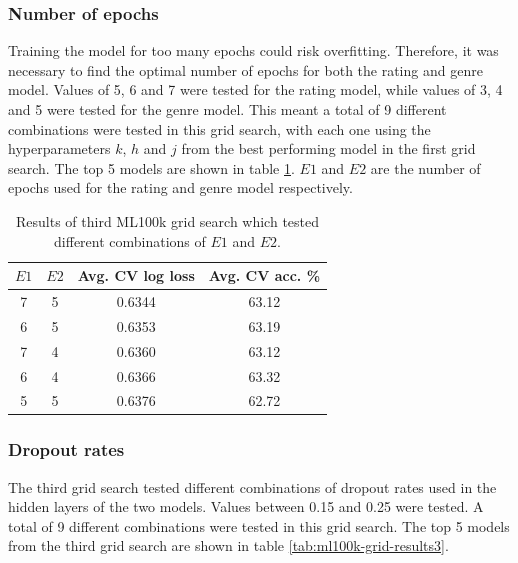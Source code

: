 \subsubsection{Number of epochs}
Training the model for too many epochs could risk overfitting. Therefore, it was necessary to find the optimal number of epochs for both the rating and genre model. Values of 5, 6 and 7 were tested for the rating model, while values of 3, 4 and 5 were tested for the genre model. This meant a total of 9 different combinations were tested in this grid search, with each one using the hyperparameters $k$, $h$ and $j$ from the best performing model in the first grid search. The top 5 models are shown in table \ref{tab:ml100k-grid-results2}. $E1$ and $E2$ are the number of epochs used for the rating and genre model respectively.

\begin{table}[H]
\centering
\begin{tabular}{c | c | c | c}
\toprule
\textbf{$E1$} & \textbf{$E2$} & \textbf{Avg. CV log loss} & \textbf{Avg. CV acc.} \% \\
\midrule
7 & 5 & 0.6344 & 63.12 \\
\midrule
6 & 5 & 0.6353 & 63.19 \\
\midrule
7 & 4 & 0.6360 & 63.12 \\
\midrule
6 & 4 & 0.6366 & 63.32 \\
\midrule
5 & 5 & 0.6376 & 62.72 \\
\bottomrule
\end{tabular}
\caption[MovieLens 100k grid search results -- number of epochs]{Results of third ML100k grid search which tested  different combinations of $E1$ and $E2$.}
\label{tab:ml100k-grid-results2}
\end{table}

\subsubsection{Dropout rates}
The third grid search tested different combinations of dropout rates used in the hidden layers of the two models. Values between 0.15 and 0.25 were tested. A total of 9 different combinations were tested in this grid search. The top 5 models from the third grid search are shown in table \ref{tab:ml100k-grid-results3}.

